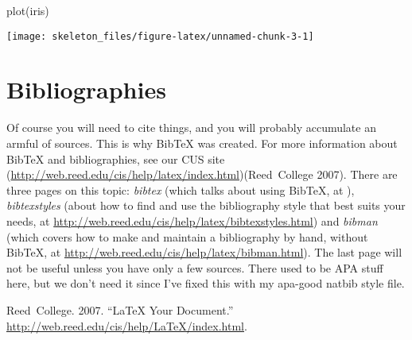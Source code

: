 \documentclass[12pt,twoside]{reedthesis}
\begin{document}
\begin{CodeChunk}
\begin{CodeInput}
plot(iris)
\end{CodeInput}


\begin{center}\texttt{[image: skeleton\_files/figure-latex/unnamed-chunk-3-1]} \end{center}

\end{CodeChunk}

\section{Bibliographies}

Of course you will need to cite things, and you will probably accumulate
an armful of sources. This is why BibTeX was created. For more
information about BibTeX and bibliographies, see our CUS site
(\url{http://web.reed.edu/cis/help/latex/index.html})(Reed{~}College
2007). There are three pages on this topic: \emph{bibtex} (which talks
about using BibTeX, at ), \emph{bibtexstyles} (about how to find and use
the bibliography style that best suits your needs, at
\url{http://web.reed.edu/cis/help/latex/bibtexstyles.html}) and
\emph{bibman} (which covers how to make and maintain a bibliography by
hand, without BibTeX, at
\url{http://web.reed.edu/cis/help/latex/bibman.html}). The last page
will not be useful unless you have only a few sources. There used to be
APA stuff here, but we don't need it since I've fixed this with my
apa-good natbib style file.

Reed{~}College. 2007. ``LaTeX Your Document.''
\url{http://web.reed.edu/cis/help/LaTeX/index.html}.



%
\end{document}
